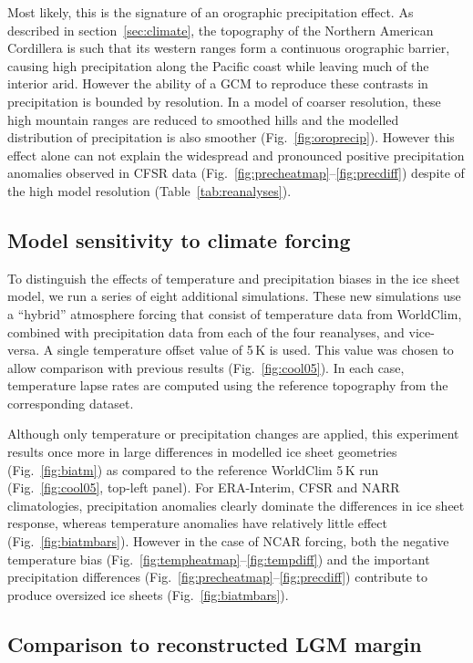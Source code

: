 Most likely, this is the signature of an orographic precipitation effect. As described in section~\ref{sec:climate}, the topography of the Northern American Cordillera is such that its western ranges form a continuous orographic barrier, causing high precipitation along the Pacific coast while leaving much of the interior arid. However the ability of a GCM to reproduce these contrasts in precipitation is bounded by resolution. In a model of coarser resolution, these high mountain ranges are reduced to smoothed hills and the modelled distribution of precipitation is also smoother (Fig.~\ref{fig:oroprecip}). However this effect alone can not explain the widespread and pronounced positive precipitation anomalies observed in CFSR data (Fig.~\ref{fig:precheatmap}--\ref{fig:precdiff}) despite of the high model resolution (Table~\ref{tab:reanalyses}).

\subsection{Model sensitivity to climate forcing}

To distinguish the effects of temperature and precipitation biases in the ice sheet model, we run a series of eight additional simulations. These new simulations use a “hybrid” atmosphere forcing that consist of temperature data from WorldClim, combined with precipitation data from each of the four reanalyses, and vice-versa. A single temperature offset value of 5\,K is used. This value was chosen to allow comparison with previous results (Fig.~\ref{fig:cool05}). In each case, temperature lapse rates are computed using the reference topography from the corresponding dataset.

Although only temperature or precipitation changes are applied, this experiment results once more in large differences in modelled ice sheet geometries (Fig.~\ref{fig:biatm}) as compared to the reference WorldClim 5\,K run (Fig.~\ref{fig:cool05}, top-left panel). For ERA-Interim, CFSR and NARR climatologies, precipitation anomalies clearly dominate the differences in ice sheet response, whereas temperature anomalies have relatively little effect (Fig.~\ref{fig:biatmbars}). However in the case of NCAR forcing, both the negative temperature bias (Fig.~\ref{fig:tempheatmap}--\ref{fig:tempdiff}) and the important precipitation differences (Fig.~\ref{fig:precheatmap}--\ref{fig:precdiff}) contribute to produce oversized ice sheets (Fig.~\ref{fig:biatmbars}).

\subsection{Comparison to reconstructed LGM margin}

